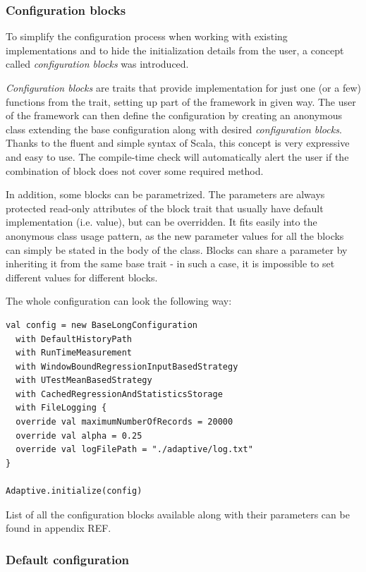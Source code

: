 \subsubsection{Configuration blocks}
 To simplify the configuration process when working with existing implementations and to hide the initialization details from the user, a concept called \textit{configuration blocks} was introduced. 
 
 \textit{Configuration blocks} are traits that provide implementation for just one (or a few) functions from the  trait, setting up part of the framework in given way. The user of the framework can then define the configuration by creating an anonymous class extending the base configuration along with desired \textit{configuration blocks}. Thanks to the fluent and simple syntax of Scala, this concept is very expressive and easy to use. The compile-time check will automatically alert the user if the combination of block does not cover some required method.
 
 In addition, some blocks can be parametrized. The parameters are always protected read-only attributes of the block trait that usually have default implementation (i.e. value), but can be overridden. It fits easily into the anonymous class usage pattern, as the new parameter values for all the blocks can simply be stated in the body of the class. Blocks can share a parameter by inheriting it from the same base trait - in such a case, it is impossible to set different values for different blocks.
 
 The whole configuration can look the following way:

\lstset{style=Scala}
\begin{lstlisting}
val config = new BaseLongConfiguration
  with DefaultHistoryPath
  with RunTimeMeasurement
  with WindowBoundRegressionInputBasedStrategy
  with UTestMeanBasedStrategy
  with CachedRegressionAndStatisticsStorage
  with FileLogging {
  override val maximumNumberOfRecords = 20000
  override val alpha = 0.25
  override val logFilePath = "./adaptive/log.txt"
}

Adaptive.initialize(config)
\end{lstlisting}

List of all the configuration blocks available along with their parameters can be found in appendix REF.


\subsubsection{Default configuration}

